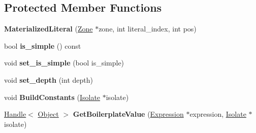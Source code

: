 \subsection*{Protected Member Functions}
\begin{DoxyCompactItemize}
\item 
{\bfseries Materialized\+Literal} (\hyperlink{classv8_1_1internal_1_1_zone}{Zone} $\ast$zone, int literal\+\_\+index, int pos)\hypertarget{classv8_1_1internal_1_1_materialized_literal_a34f60085fdc4b897de5228308a3cc05b}{}\label{classv8_1_1internal_1_1_materialized_literal_a34f60085fdc4b897de5228308a3cc05b}

\item 
bool {\bfseries is\+\_\+simple} () const \hypertarget{classv8_1_1internal_1_1_materialized_literal_a643c47090fae04dc32ec66973734f38d}{}\label{classv8_1_1internal_1_1_materialized_literal_a643c47090fae04dc32ec66973734f38d}

\item 
void {\bfseries set\+\_\+is\+\_\+simple} (bool is\+\_\+simple)\hypertarget{classv8_1_1internal_1_1_materialized_literal_a55d53455fa0e5d33bc1c73edb99a23d3}{}\label{classv8_1_1internal_1_1_materialized_literal_a55d53455fa0e5d33bc1c73edb99a23d3}

\item 
void {\bfseries set\+\_\+depth} (int depth)\hypertarget{classv8_1_1internal_1_1_materialized_literal_a1a52f1c2c35cfdf122ad0bcea7e6e2a6}{}\label{classv8_1_1internal_1_1_materialized_literal_a1a52f1c2c35cfdf122ad0bcea7e6e2a6}

\item 
void {\bfseries Build\+Constants} (\hyperlink{classv8_1_1internal_1_1_isolate}{Isolate} $\ast$isolate)\hypertarget{classv8_1_1internal_1_1_materialized_literal_a8aa06fd94266a295ae6628925fea436d}{}\label{classv8_1_1internal_1_1_materialized_literal_a8aa06fd94266a295ae6628925fea436d}

\item 
\hyperlink{classv8_1_1internal_1_1_handle}{Handle}$<$ \hyperlink{classv8_1_1internal_1_1_object}{Object} $>$ {\bfseries Get\+Boilerplate\+Value} (\hyperlink{classv8_1_1internal_1_1_expression}{Expression} $\ast$expression, \hyperlink{classv8_1_1internal_1_1_isolate}{Isolate} $\ast$isolate)\hypertarget{classv8_1_1internal_1_1_materialized_literal_a3f2e9681f5506407af5bf2c23e142bbd}{}\label{classv8_1_1internal_1_1_materialized_literal_a3f2e9681f5506407af5bf2c23e142bbd}

\end{DoxyCompactItemize}
